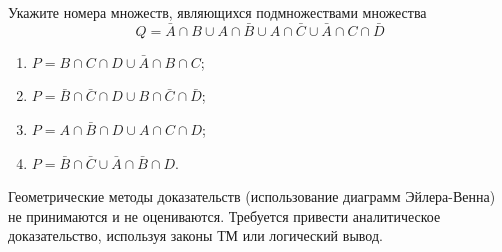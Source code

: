 \question
Укажите номера множеств, являющихся подмножествами множества
\begin{equation*}
	Q = \bar{A} \cap B \cup A \cap \bar{B} \cup A \cap \bar{C} \cup \bar{A} \cap C \cap \bar{D}
\end{equation*}

\begin{enumerate}
	\renewcommand{\labelenumi}{\arabic{enumi})}
	\item $P = B \cap C \cap D \cup \bar{A} \cap B \cap C$;
	\item $P = \bar{B} \cap \bar{C} \cap D \cup B \cap \bar{C} \cap \bar{D}$;
	\item $P = A \cap \bar{B} \cap D \cup A \cap C \cap D$;
	\item $P = \bar{B} \cap \bar{C} \cup \bar{A} \cap \bar{B} \cap D$.
\end{enumerate}

Геометрические методы доказательств (использование диаграмм Эйлера-Венна) не принимаются и не оцениваются. Требуется привести аналитическое доказательство, используя законы ТМ или логический вывод.
